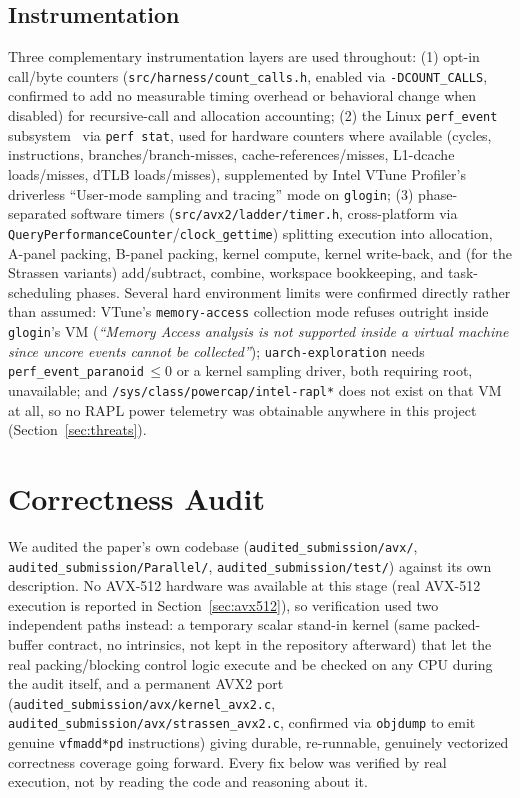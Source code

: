 \documentclass[acmsmall]{acmart}
\begin{document}
\subsection{Instrumentation}
Three complementary instrumentation layers are used throughout: (1)
opt-in call/byte counters (\texttt{src/harness/count\_calls.h}, enabled via
\texttt{-DCOUNT\_CALLS}, confirmed to add no measurable timing overhead
or behavioral change when disabled) for recursive-call and allocation
accounting; (2) the Linux \texttt{perf\_event} subsystem~\cite{weaver2013perfevent}
via \texttt{perf stat}, used for hardware counters where available
(cycles, instructions, branches/branch-misses, cache-references/misses,
L1-dcache loads/misses, dTLB loads/misses), supplemented by Intel VTune
Profiler's driverless ``User-mode sampling and tracing'' mode on
\texttt{glogin}; (3) phase-separated software timers
(\texttt{src/avx2/ladder/timer.h}, cross-platform via
\texttt{QueryPerformanceCounter}/\texttt{clock\_gettime}) splitting
execution into allocation, A-panel packing, B-panel packing, kernel
compute, kernel write-back, and (for the Strassen variants)
add/subtract, combine, workspace bookkeeping, and task-scheduling
phases. Several hard environment limits were confirmed directly rather
than assumed: VTune's \texttt{memory-access} collection mode refuses
outright inside \texttt{glogin}'s VM (\emph{``Memory Access analysis is
not supported inside a virtual machine since uncore events cannot be
collected''}); \texttt{uarch-exploration} needs
\texttt{perf\_event\_paranoid}$\,\leq 0$ or a kernel sampling driver,
both requiring root, unavailable; and \texttt{/sys/class/powercap/intel-rapl*}
does not exist on that VM at all, so no RAPL power telemetry was
obtainable anywhere in this project (Section~\ref{sec:threats}).

\section{Correctness Audit}
\label{sec:audit}

We audited the paper's own codebase (\texttt{audited\_submission/avx/}, \texttt{audited\_submission/Parallel/},
\texttt{audited\_submission/test/}) against its own description. No AVX-512
hardware was available at this stage (real AVX-512 execution is
reported in Section~\ref{sec:avx512}), so verification used two
independent paths instead: a temporary scalar stand-in kernel (same
packed-buffer contract, no intrinsics, not kept in the repository
afterward) that let the real packing/blocking control logic execute and
be checked on any CPU during the audit itself, and a permanent AVX2 port
(\texttt{audited\_submission/avx/kernel\_avx2.c},
\texttt{audited\_submission/avx/strassen\_avx2.c}, confirmed via \texttt{objdump} to emit
genuine \texttt{vfmadd*pd} instructions) giving durable, re-runnable,
genuinely vectorized correctness coverage going forward. Every fix below
was verified by real execution, not by reading the code and reasoning
about it.
\end{document}

